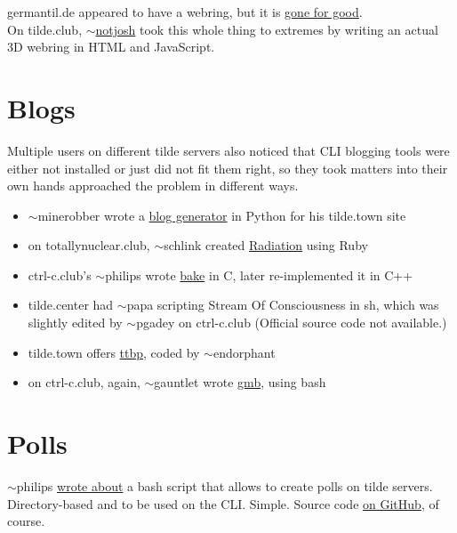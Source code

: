germantil.de appeared to have a webring, but it is \href{http://web.archive.org/web/20141025180728/http://germantil.de/~ahava/webring.html}{gone for good}.
\\

On tilde.club, \href{http://tilde.club/~notjosh/}{$\sim$notjosh} took this whole thing to extremes by writing an actual 3D webring in HTML and JavaScript.

\section{Blogs}
Multiple users on different tilde servers also noticed that CLI blogging tools were either not installed or just did not fit them right, so they took matters into their own hands approached the problem in different ways.
\\
\begin{itemize}
	\item $\sim$minerobber wrote a \href{https://github.com/MineRobber9000/blog-gen}{blog generator} in Python for his tilde.town site
	\item on totallynuclear.club, $\sim$schlink created \href{https://github.com/sts10/radiation}{Radiation} using Ruby
	\item ctrl-c.club's $\sim$philips wrote \href{https://github.com/felipetavares/bake/blob/master/README.md}{bake} in C, later re-implemented it in C++
	\item tilde.center had $\sim$papa scripting Stream Of Consciousness in sh, which was slightly edited by $\sim$pgadey on ctrl-c.club (Official source code not available.)
  \item tilde.town offers \href{http://tilde.town/~endorphant/ttbp/}{ttbp}, coded by $\sim$endorphant
	\item on ctrl-c.club, again, $\sim$gauntlet wrote \href{https://github.com/gauntletm/gmb}{gmb}, using bash
\end{itemize}

\section{Polls}
$\sim$philips \href{http://ctrl-c.club/~philips/index.html#Poll}{wrote about} a bash script that allows to create polls on tilde servers. Directory-based and to be used on the CLI. Simple. Source code \href{https://github.com/felipetavares/poll}{on GitHub}, of course.


